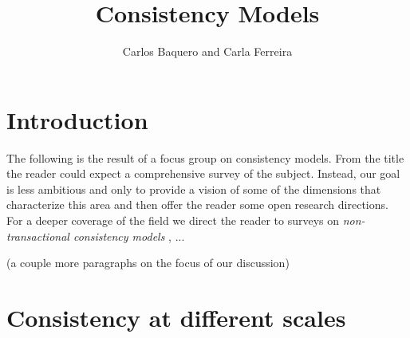 %

\begin{bibunit}
	
	\title*{Consistency Models}
	\author{Carlos Baquero and Carla Ferreira}
	
	\maketitle
	

        \section{Introduction}

        The following is the result of a focus group on consistency models. From the title the reader could expect a comprehensive survey of the subject. Instead, our goal is less ambitious and only to provide a vision of some of the dimensions that characterize this area and then offer the reader some open research directions. For a deeper coverage of the field we direct the reader to surveys on \emph{non-transactional consistency models} \cite{Viotti:2016:CND:2911992.2926965}, ...  %

        (a couple more paragraphs on the focus of our discussion)


	\section{Consistency at different scales}\label{sec:1}



\end{bibunit}
